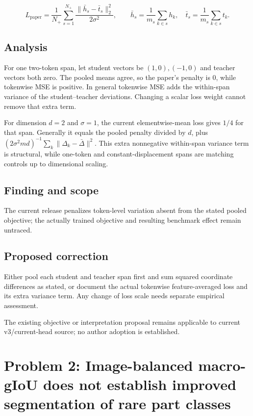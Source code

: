 \documentclass[11pt]{article}
\begin{document}
\[L_{\mathrm{paper}}=\frac1{N_+}\sum_{s=1}^{N_+} \frac{\|\bar h_s-\bar t_s\|_2^2}{2\sigma^2},\qquad \bar h_s=\frac1{m_s}\sum_{k\in s}h_k,\quad \bar t_s=\frac1{m_s}\sum_{k\in s}t_k.\]

\subsection*{Analysis}

For one two-token span, let student vectors be \((1,0),(-1,0)\) and teacher vectors both zero. The pooled means agree, so the paper's penalty is \(0\), while tokenwise MSE is positive. In general tokenwise MSE adds the within-span variance of the student–teacher deviations. Changing a scalar loss weight cannot remove that extra term.

For dimension \(d=2\) and \(\sigma=1\), the current elementwise-mean loss gives \(1/4\) for that span. Generally it equals the pooled penalty divided by \(d\), plus \((2\sigma^2md)^{-1}\sum_k\|\Delta_k-\bar\Delta\|^2\). This extra nonnegative within-span variance term is structural, while one-token and constant-displacement spans are matching controls up to dimensional scaling.

\subsection*{Finding and scope}

The current release penalizes token-level variation absent from the stated pooled objective; the actually trained objective and resulting benchmark effect remain untraced.

\subsection*{Proposed correction}

Either pool each student and teacher span first and sum squared coordinate differences as stated, or document the actual tokenwise feature-averaged loss and its extra variance term. Any change of loss scale needs separate empirical assessment.

The existing objective or interpretation proposal remains applicable to current v3/current-head source; no author adoption is established.

\section*{Problem 2: Image-balanced macro-gIoU does not establish improved segmentation of rare part classes}
\end{document}
